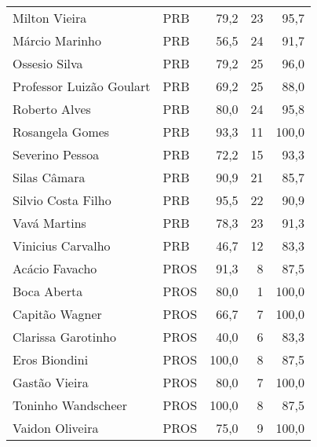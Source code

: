 \begin{longtable}{llrrr}
                       Milton Vieira &            PRB &      79,2 &           23 &       95,7 \\
                      Márcio Marinho &            PRB &      56,5 &           24 &       91,7 \\
                       Ossesio Silva &            PRB &      79,2 &           25 &       96,0 \\
            Professor Luizão Goulart &            PRB &      69,2 &           25 &       88,0 \\
                       Roberto Alves &            PRB &      80,0 &           24 &       95,8 \\
                     Rosangela Gomes &            PRB &      93,3 &           11 &      100,0 \\
                     Severino Pessoa &            PRB &      72,2 &           15 &       93,3 \\
                        Silas Câmara &            PRB &      90,9 &           21 &       85,7 \\
                  Silvio Costa Filho &            PRB &      95,5 &           22 &       90,9 \\
                        Vavá Martins &            PRB &      78,3 &           23 &       91,3 \\
                   Vinicius Carvalho &            PRB &      46,7 &           12 &       83,3 \\
                      Acácio Favacho &           PROS &      91,3 &            8 &       87,5 \\
                         Boca Aberta &           PROS &      80,0 &            1 &      100,0 \\
                      Capitão Wagner &           PROS &      66,7 &            7 &      100,0 \\
                  Clarissa Garotinho &           PROS &      40,0 &            6 &       83,3 \\
                       Eros Biondini &           PROS &     100,0 &            8 &       87,5 \\
                       Gastão Vieira &           PROS &      80,0 &            7 &      100,0 \\
                  Toninho Wandscheer &           PROS &     100,0 &            8 &       87,5 \\
                     Vaidon Oliveira &           PROS &      75,0 &            9 &      100,0 \\

\end{longtable}
